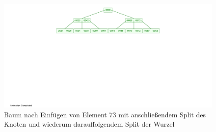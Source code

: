 \documentclass[12pt]{scrartcl}
\begin{document}
\begin{figure}[h!]
\begin{center}
\includegraphics[scale=0.5]{B-Tree9.png}
\caption{Baum nach Einfügen von Element 73 mit anschließendem Split des Knoten und wiederum darauffolgendem Split der Wurzel}
\end{center}
\end{figure}



\end{document}
